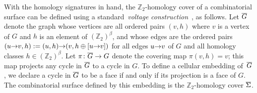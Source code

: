 \documentclass[twoside,leqno,twocolumn]{article}
\def\arcto{\mathord\shortrightarrow}
\def\arc#1#2{#1\arcto#2}
\def\Z{\mathbb{Z}}
\def\Real{\mathbb{R}}
\let\cycle\gamma
\def\Sigmabar{\overline{\smash{\Sigma}\vphantom{t}}}
\def\Gbar{\overline{\smash{G}\vphantom{t}}}
\begin{document}
%

With the homology signatures in hand, the $\Z_2$-homology cover of a combinatorial surface can be defined using a standard~\emph{voltage construction}~\cite[Chapter 4]{gt-tgt-01}, as follows.  Let $\Gbar$ denote the graph whose vertices are all ordered pairs $(v, h)$ where $v$ is a vertex of $G$ and $h$ is an element of $(\Z_2)^\beta$, and whose edges are the ordered pairs $(\arc{u}{v}, h) := (u, h)\arcto(v, h\oplus [u\arcto v])$ for all edges $\arc{u}{v}$ of $G$ and all homology classes $h \in (\Z_2)^\beta$.  Let $\pi\colon \Gbar\to G$ denote the covering map $\pi(v, h) = v$; this map projects any cycle in $\Gbar$ to a cycle in $G$.  To define a cellular embedding of~$\Gbar$, we declare a cycle in $\Gbar$ to be a face if and only if its projection is a face of $G$.  The combinatorial surface defined by this embedding is the $\Z_2$-homology cover $\Sigmabar$.
\end{document}
